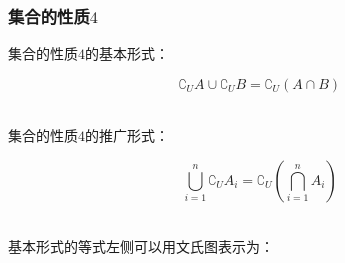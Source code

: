 \documentclass[UTF8]{ctexart}
\begin{document}
\subsubsection{集合的性质$4$}
    集合的性质$4$的基本形式：
    \begin{large}
        \begin{equation*}
            \complement_UA\cup\complement_UB=\complement_U\left(A\cap B\right)
        \end{equation*}
    \end{large}\\
    集合的性质$4$的推广形式：
    \begin{large}
        \begin{equation*}
            \bigcup_{i=1}^n \complement_UA_i=\complement_U\left(\bigcap_{i=1}^n A_i\right)
        \end{equation*}
    \end{large}\\[5mm]
    基本形式的等式左侧可以用文氏图表示为：\vspace{5pt}
\end{document}
